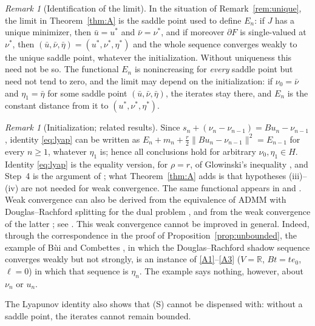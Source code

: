 \documentclass[11pt]{amsart}
\theoremstyle{definition}
\theoremstyle{remark}
\newtheorem{remark}[theorem]{Remark}
\numberwithin{equation}{section}
\newcommand{\R}{\mathbb{R}}
\newcommand{\norm}[1]{\lVert #1\rVert}
\begin{document}
\begin{remark}[Identification of the limit]\label{rem:limit}
In the situation of Remark~\ref{rem:unique}, the limit in Theorem~\ref{thm:A} is the saddle point used to define $E_n$: if $J$ has a unique minimizer, then $\bar u=u^*$ and $\bar\nu=\nu^*$, and if moreover $\partial F$ is single-valued at $\nu^*$, then $(\bar u,\bar\nu,\bar\eta)=(u^*,\nu^*,\eta^*)$ and the whole sequence converges weakly to the unique saddle point, whatever the initialization. Without uniqueness this need not be so. The functional $E_n$ is nonincreasing for \emph{every} saddle point but need not tend to zero, and the limit may depend on the initialization: if $\nu_0=\bar\nu$ and $\eta_1=\bar\eta$ for some saddle point $(\bar u,\bar\nu,\bar\eta)$, the iterates stay there, and $E_n$ is the constant distance from it to $(u^*,\nu^*,\eta^*)$.
\end{remark}

\begin{remark}[Initialization; related results]\label{rem:init}\label{rem:A-literature}
Since $s_n+(\nu_n-\nu_{n-1})=Bu_n-\nu_{n-1}$, identity \eqref{eq:lyap} can be written as $E_n+m_n+\frac r2\norm{Bu_n-\nu_{n-1}}^2=E_{n-1}$ for every $n\ge1$, whatever $\eta_1$ is; hence all conclusions hold for arbitrary $\nu_0,\eta_1\in H$. Identity \eqref{eq:lyap} is the equality version, for $\rho=r$, of Glowinski's inequality \cite[Ch.~VI, (5.25)]{Glowinski1984ChVI}, and Step~4 is the argument of \cite[Ch.~VI, \S7]{Glowinski1984ChVI}; what Theorem~\ref{thm:A} adds is that hypotheses (iii)--(iv) are not needed for weak convergence. The same functional appears in \cite[Thm.~3.7]{BartelsMilicevic2017} and \cite[App.~A]{Boyd2011ADMM}. Weak convergence can also be derived from the equivalence of ADMM with Douglas--Rachford splitting for the dual problem \cite{Gabay1983}, \cite[\S5]{EcksteinBertsekas1992} and from the weak convergence of the latter \cite{LionsMercier1979,Svaiter2011,BauschkeCombettes2017}; see \cite{MoradifamNachman2011}. This weak convergence cannot be improved in general. Indeed, through the correspondence in the proof of Proposition~\ref{prop:unbounded}, the example of B\`ui and Combettes \cite{BuiCombettes2020}, in which the Douglas--Rachford shadow sequence converges weakly but not strongly, is an instance of \ref{A1}--\ref{A3} ($V=\R$, $Bt=te_0$, $\ell=0$) in which that sequence is $\eta_n$. The example says nothing, however, about $\nu_n$ or $u_n$.
\end{remark}

The Lyapunov identity also shows that (S) cannot be dispensed with: without a saddle point, the iterates cannot remain bounded.
\end{document}
